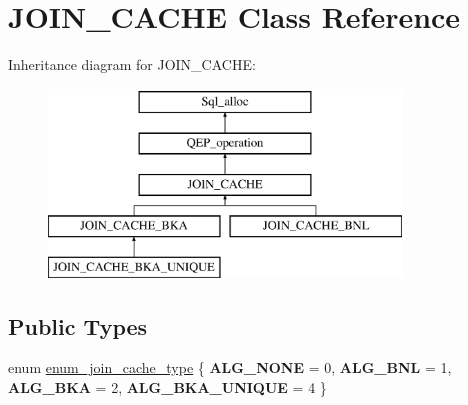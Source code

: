 \hypertarget{classJOIN__CACHE}{}\section{J\+O\+I\+N\+\_\+\+C\+A\+C\+HE Class Reference}
\label{classJOIN__CACHE}
Inheritance diagram for J\+O\+I\+N\+\_\+\+C\+A\+C\+HE\+:\begin{figure}[H]
\begin{center}
\leavevmode
\includegraphics[height=5.000000cm]{classJOIN__CACHE}
\end{center}
\end{figure}
\subsection*{Public Types}
\begin{DoxyCompactItemize}
\item 
enum \mbox{\hyperlink{classJOIN__CACHE_a74b45254b4573b9531f1b8b536b18e46}{enum\+\_\+join\+\_\+cache\+\_\+type}} \{ {\bfseries A\+L\+G\+\_\+\+N\+O\+NE} = 0, 
{\bfseries A\+L\+G\+\_\+\+B\+NL} = 1, 
{\bfseries A\+L\+G\+\_\+\+B\+KA} = 2, 
{\bfseries A\+L\+G\+\_\+\+B\+K\+A\+\_\+\+U\+N\+I\+Q\+UE} = 4
 \}
\end{DoxyCompactItemize}
